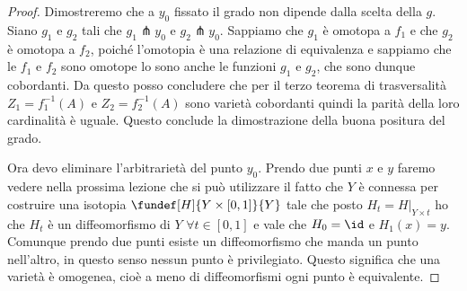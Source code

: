 \begin{proof}
 Dimostreremo che a $y_{0}$ fissato il grado non dipende dalla scelta della $g$. Siano $g_{1}$ e $g_{2}$ tali che $g_1 \pitchfork {y_0}$ e $g_{2} \pitchfork {y_{0}}$.
 Sappiamo che $g_{1}$ è omotopa a $f_{1}$ e che $g_{2}$ è omotopa a $f_{2}$, poiché l'omotopia è una relazione di equivalenza e sappiamo che le $f_{1}$ e $f_{2}$ sono omotope lo sono 
 anche le funzioni $g_{1}$ e $g_{2}$, che sono dunque cobordanti. Da questo posso concludere che per il terzo teorema di trasversalità $Z_{1} = f_{1}^{-1} (A)$ e $Z_{2} = f_{2}^{-1} (A)$ sono
 varietà cobordanti quindi la parità della loro cardinalità è uguale. Questo conclude la dimostrazione della buona positura del grado.
 
 
Ora devo eliminare l'arbitrarietà del punto $y_{0}$. Prendo due punti $x$ e $y$ faremo vedere nella prossima lezione che si può utilizzare il fatto che $Y$ è connessa per costruire una isotopia
$\fundef[H]{Y \times [0,1]}{Y}$ tale che posto $H_{t} = H|_{Y \times {t}}$ ho che $H_{t}$ è un diffeomorfismo di $Y$ $\forall t \in [0,1]$  e vale che $H_{0} = \id$ e $H_{1} (x) = y$.
Comunque prendo due punti esiste un diffeomorfismo che manda un punto nell'altro, in questo senso nessun punto è privilegiato. Questo significa che una varietà è omogenea, cioè a meno di 
diffeomorfismi ogni punto è equivalente.
\end{proof}



